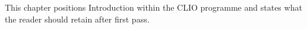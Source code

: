 This chapter positions Introduction within the CLIO programme and states what the reader should retain after first pass.
